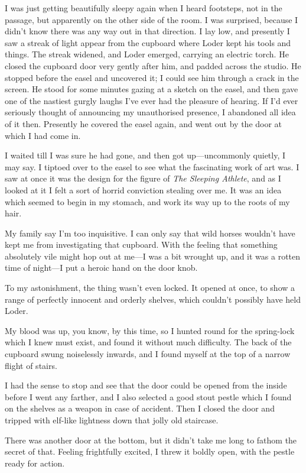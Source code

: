 I was just getting beautifully sleepy again when I heard footsteps, not in the passage, but apparently on the other side of the room. I was surprised, because I didn't know there was any way out in that direction. I lay low, and presently I saw a streak of light appear from the cupboard where Loder kept his tools and things. The streak widened, and Loder emerged, carrying an electric torch. He closed the cupboard door very gently after him, and padded across the studio. He stopped before the easel and uncovered it; I could see him through a crack in the screen. He stood for some minutes gazing at a sketch on the easel, and then gave one of the nastiest gurgly laughs I've ever had the pleasure of hearing. If I'd ever seriously thought of announcing my unauthorised presence, I abandoned all idea of it then. Presently he covered the easel again, and went out by the door at which I had come in.

I waited till I was sure he had gone, and then got up—uncommonly quietly, I may say. I tiptoed over to the easel to see what the fascinating work of art was. I saw at once it was the design for the figure of \textit{The Sleeping Athlete}, and as I looked at it I felt a sort of horrid conviction stealing over me. It was an idea which seemed to begin in my stomach, and work its way up to the roots of my hair.

My family say I'm too inquisitive. I can only say that wild horses wouldn't have kept me from investigating that cupboard. With the feeling that something absolutely vile might hop out at me—I was a bit wrought up, and it was a rotten time of night—I put a heroic hand on the door knob.

To my astonishment, the thing wasn't even locked. It opened at once, to show a range of perfectly innocent and orderly shelves, which couldn't possibly have held Loder.

My blood was up, you know, by this time, so I hunted round for the spring-lock which I knew must exist, and found it without much difficulty. The back of the cupboard swung noiselessly inwards, and I found myself at the top of a narrow flight of stairs.

I had the sense to stop and see that the door could be opened from the inside before I went any farther, and I also selected a good stout pestle which I found on the shelves as a weapon in case of accident. Then I closed the door and tripped with elf-like lightness down that jolly old staircase.

There was another door at the bottom, but it didn't take me long to fathom the secret of that. Feeling frightfully excited, I threw it boldly open, with the pestle ready for action.

